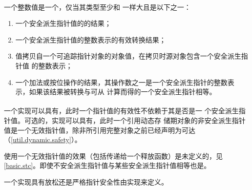 \paragraph{} %
一个整数值是一个，仅当其类型至少和
一样大且是以下之一：
\begin{enumerate}
  \item 一个安全派生指针值的的结果；
  \item 一个安全派生指针值的整数表示的有效转换结果；
  \item 值拷贝自一个可追踪指针对象的对象值，在拷贝时源对象包含一个安全派生指针值
        的整数表示；
  \item 一个加法或按位操作的结果，其操作数之一是一个安全派生指针的整数表
        示，如果该结果被转换与可从
        计算而得的一个安全派生指针相等。
\end{enumerate}

\paragraph{} %
一个实现可以具有，此时一个指针值的有效性不依赖于其是否是一
个安全派生指针值。可选的，实现可以具有，此时一个引用动态存
储期对象的非安全派生指针值是一个无效指针值，除非所引用完整对象之前已经声明为可达
（\ref{util.dynamic.safety}）。

\begin{note}
  使用一个无效指针值的效果（包括传递给一个释放函数）是未定义的，见
  \ref{basic.stc}。即使不安全派生指针值与某些安全派生指针值相等也是。
\end{note}

一个实现具有放松还是严格指针安全性由实现来定义。
